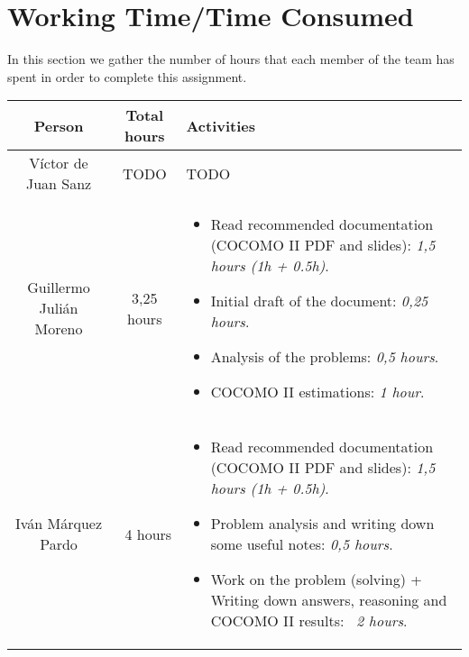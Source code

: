 \section{Working Time/Time Consumed}
In this section we gather the number of hours that each member of the team has spent in order to complete this assignment.

\begin{table}[hbtp]
\begin{tabular}{|c|c|p{8cm}|} \hline
\textbf{Person} & \textbf{Total hours} & \textbf{Activities} \\ \hline
V\'ictor de Juan Sanz & TODO & TODO \\ \hline
Guillermo Juli\'an Moreno & 3,25 hours & \begin{itemize}
\item Read recommended documentation (COCOMO II PDF and slides): \emph{1,5 hours (1h + 0.5h)}.
\item Initial draft of the document: \emph{0,25 hours}.
\item Analysis of the problems: \emph{0,5 hours}.
\item COCOMO II estimations: \emph{1 hour}.
\end{itemize} \\ \hline
Iv\'an M\'arquez Pardo & ~4 hours &
\begin{itemize}
\item Read recommended documentation (COCOMO II PDF and slides): \emph{1,5 hours (1h + 0.5h)}.
\item Problem analysis and writing down some useful notes: \emph{0,5 hours}.
\item Work on the problem (solving) + Writing down answers, reasoning and COCOMO II results: \emph{~2 hours}.
\end{itemize} \\ \hline
\end{tabular}
\end{table}
